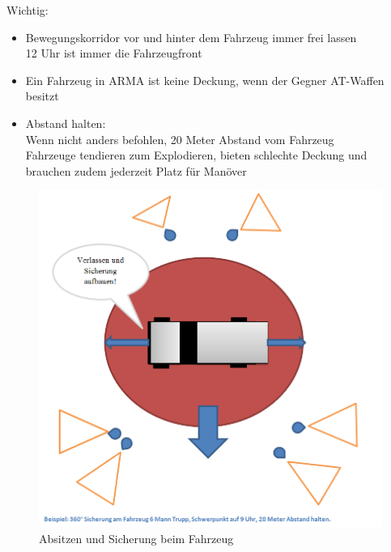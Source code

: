 	Wichtig:
	\begin{itemize}
		\item Bewegungskorridor vor und hinter dem Fahrzeug immer frei lassen\\ 12 Uhr ist immer die Fahrzeugfront
		\item Ein Fahrzeug in ARMA ist keine Deckung, wenn der Gegner AT-Waffen besitzt
		\item Abstand halten:\\ Wenn nicht anders befohlen, 20 Meter Abstand vom Fahrzeug\\ Fahrzeuge tendieren zum Explodieren, bieten schlechte Deckung und brauchen zudem jederzeit Platz für Manöver
	\end{itemize}
	\begin{figure}[htbp]
		\centering
		\includegraphics[width=15cm]{./img/grundlagen/umgangMitFahrzeugen/Fahrzeug_verlassen.png}
		\caption{Absitzen und Sicherung beim Fahrzeug}
	\end{figure}

